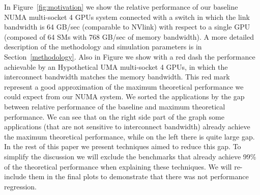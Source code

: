 In Figure~\ref{fig:motivation} we show the relative performance of our 
baseline NUMA multi-socket 4 GPUs system connected with a switch in which the 
link bandwidth is 64 GB/sec (comparable to NVlink) with respect to a single 
GPU (composed of 64 SMs with 768 GB/sec of memory bandwidth). A more detailed 
description of the methodology and simulation parameters is in 
Section~\ref{methodology}. Also in Figure we show with a red dash the 
performance achievable by an Hypothetical UMA multi-socket 4 GPUs, in which 
the interconnect bandwidth matches the memory bandwidth. This red mark 
represent a good approximation of the maximum theoretical performance we 
could expect from our NUMA system. We sorted the applications by the gap 
between relative performance of the baseline and maximum theoretical 
performance. We can see that on the right side part of the graph some 
applications (that are not sensitive to interconnect bandwidth) already 
achieve the maximum theoretical performance, while on the left there is quite 
large gap. In the rest of this paper we present techniques aimed to reduce 
this gap. To simplify the discussion we will exclude the benchmarks that 
already achieve 99\% of the theoretical performance when explaining these 
techniques. We will re-include them in the final plots to demonstrate that 
there was not performance regression. 